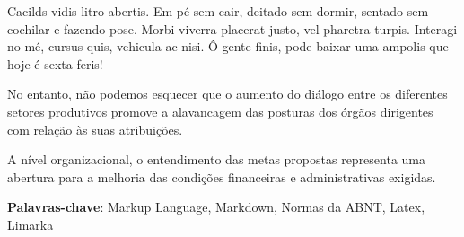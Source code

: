 \documentclass[
	12pt,				%
	oneside,			%
	a4paper,			%
	english,			%
	french,				%
	spanish,			%
	brazil				%
	]{abntex2}
\begin{document}

\frenchspacing


\imprimircapa



\imprimirfolhaderosto





\begin{dedicatoria}
   \vspace*{\fill}
   \centering
   \noindent

    Cacilds vidis litro abertis. Em pé sem cair, deitado sem dormir, sentado
    sem cochilar e fazendo pose. Morbi viverra placerat justo, vel pharetra
    turpis. Interagi no mé, cursus quis, vehicula ac nisi. Ô gente finis,
    pode baixar uma ampolis que hoje é sexta-feris!

   \vspace*{\fill}
\end{dedicatoria}
\begin{agradecimentos}

No entanto, não podemos esquecer que o aumento do diálogo entre os
diferentes setores produtivos promove a alavancagem das posturas dos
órgãos dirigentes com relação às suas atribuições.

\end{agradecimentos}



\setlength{\absparsep}{18pt} %
\begin{resumo}

  A nível organizacional, o entendimento das metas propostas representa
  uma abertura para a melhoria das condições financeiras e administrativas
  exigidas.

 \textbf{Palavras-chave}: Markup Language, Markdown, Normas da ABNT, Latex, Limarka
\end{resumo}
\end{document}
